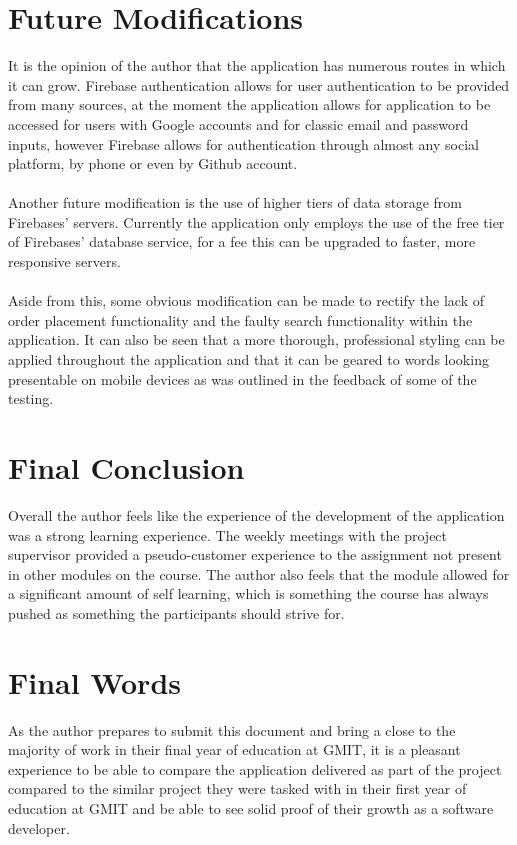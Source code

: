 \section{Future Modifications}
It is the opinion of the author that the application has numerous routes in which it can grow. Firebase authentication allows for user authentication to be provided from many sources, at the moment the application allows for application to be accessed for users with Google accounts and for classic email and password inputs, however Firebase allows for authentication through almost any social platform, by phone or even by Github account. \\ \\
Another future modification is the use of higher tiers of data storage from Firebases' servers. Currently the application only employs the use of the free tier of Firebases' database service, for a fee this can be upgraded to faster, more responsive servers. \\ \\
Aside from this, some obvious modification can be made to rectify the lack of order placement functionality and the faulty search functionality within the application. It can also be seen that a more thorough, professional styling can be applied throughout the application and that it can be geared to words looking presentable on mobile devices as was outlined in the feedback of some of the testing. 

\section{Final Conclusion}
Overall the author feels like the experience of the development of the application was a strong learning experience. The weekly meetings with the project supervisor provided a pseudo-customer experience to the assignment not present in other modules on the course. The author also feels that the module allowed for a significant amount of self learning, which is something the course has always pushed as something the participants should strive for.

\section{Final Words}
As the author prepares to submit this document and bring a close to the majority of work in their final year of education at GMIT, it is a pleasant experience to be able to compare the application delivered as part of the project compared to the similar project they were tasked with in their first year of education at GMIT and be able to see solid proof of their growth as a software developer.



















